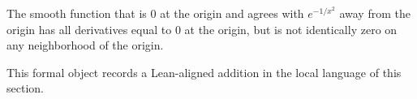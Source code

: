 \begin{remark*}
The smooth function that is $0$ at the origin and agrees with $e^{-1/x^2}$ away from the origin has all derivatives equal to $0$ at the origin, but is not identically zero on any neighborhood of the origin.
\end{remark*}

\begin{remark*}[Interpretation]
This formal object records a Lean-aligned addition in the local language of this section.
\end{remark*}

\begin{dependencies}
\NoLocalDependencies
\end{dependencies}
